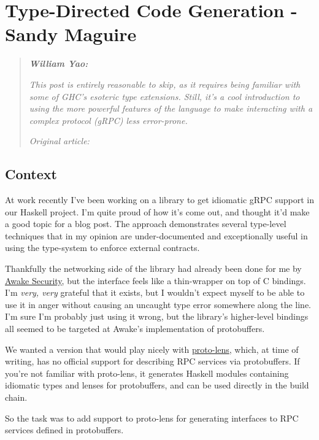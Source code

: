 \chapter{Type-Directed Code Generation - Sandy Maguire}


\begin{quotation}
\noindent\textit{\textbf{William Yao:}}

\textit{This post is entirely reasonable to skip, as it requires being familiar with some of GHC's esoteric type extensions. Still, it's a cool introduction to using the more powerful features of the language to make interacting with a complex protocol (gRPC) less error-prone.}

\vspace{\baselineskip}
\noindent\textit{Original article: \cite{type_directed_code_generation}}
\end{quotation}


\section{Context}


At work recently I've been working on a library to get idiomatic gRPC support in our Haskell project. I'm quite proud of how it's come out, and thought it'd make a good topic for a blog post. The approach demonstrates several type-level techniques that in my opinion are under-documented and exceptionally useful in using the type-system to enforce external contracts.

Thankfully the networking side of the library had already been done for me by \href{https://github.com/awakesecurity/gRPC-haskell}{Awake Security}, but the interface feels like a thin-wrapper on top of C bindings. I'm \textit{very, very} grateful that it exists, but I wouldn't expect myself to be able to use it in anger without causing an uncaught type error somewhere along the line. I'm sure I'm probably just using it wrong, but the library's higher-level bindings all seemed to be targeted at Awake's implementation of protobuffers.

We wanted a version that would play nicely with \href{https://github.com/google/proto-lens}{proto-lens}, which, at time of writing, has no official support for describing RPC services via protobuffers. If you're not familiar with proto-lens, it generates Haskell modules containing idiomatic types and lenses for protobuffers, and can be used directly in the build chain.

So the task was to add support to proto-lens for generating interfaces to RPC services defined in protobuffers.

